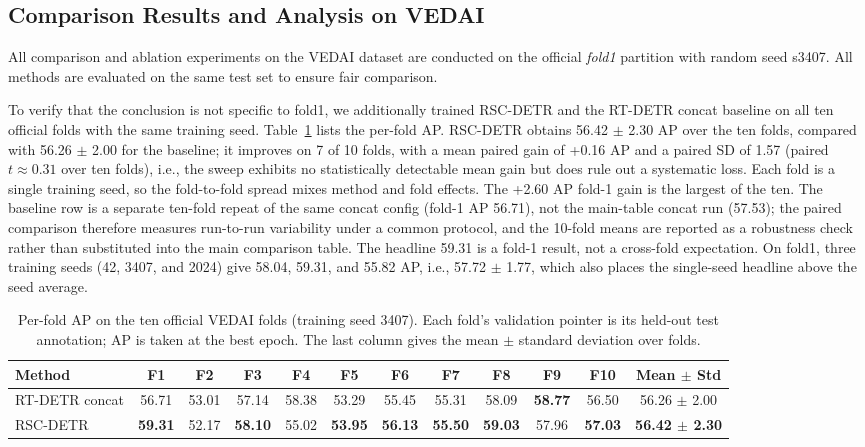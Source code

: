 \documentclass[letterpaper,journal]{IEEEtran}
\begin{document}
\subsection{Comparison Results and Analysis on VEDAI}
\label{sec:vedai_results}
All comparison and ablation experiments on the VEDAI dataset are conducted on the official \textit{fold1} partition with random seed s3407. All methods are evaluated on the same test set to ensure fair comparison.

To verify that the conclusion is not specific to fold1, we additionally trained RSC-DETR and the RT-DETR concat baseline on all ten official folds with the same training seed. Table~\ref{tab:vedai_10fold} lists the per-fold AP. RSC-DETR obtains 56.42 $\pm$ 2.30 AP over the ten folds, compared with 56.26 $\pm$ 2.00 for the baseline; it improves on 7 of 10 folds, with a mean paired gain of +0.16 AP and a paired SD of 1.57 (paired $t \approx 0.31$ over ten folds), i.e., the sweep exhibits no statistically detectable mean gain but does rule out a systematic loss. Each fold is a single training seed, so the fold-to-fold spread mixes method and fold effects. The +2.60 AP fold-1 gain is the largest of the ten. The baseline row is a separate ten-fold repeat of the same concat config (fold-1 AP 56.71), not the main-table concat run (57.53); the paired comparison therefore measures run-to-run variability under a common protocol, and the 10-fold means are reported as a robustness check rather than substituted into the main comparison table. The headline 59.31 is a fold-1 result, not a cross-fold expectation. On fold1, three training seeds (42, 3407, and 2024) give 58.04, 59.31, and 55.82 AP, i.e., 57.72 $\pm$ 1.77, which also places the single-seed headline above the seed average.

\begin{table}[!t]
\centering
\caption{Per-fold AP on the ten official VEDAI folds (training seed 3407). Each fold's validation pointer is its held-out test annotation; AP is taken at the best epoch. The last column gives the mean $\pm$ standard deviation over folds.}
\label{tab:vedai_10fold}
\setlength{\tabcolsep}{4pt}
\small
\begin{tabular}{lccccccccccc}
\toprule
Method & F1 & F2 & F3 & F4 & F5 & F6 & F7 & F8 & F9 & F10 & Mean $\pm$ Std \\
\midrule
RT-DETR concat & 56.71 & 53.01 & 57.14 & 58.38 & 53.29 & 55.45 & 55.31 & 58.09 & \textbf{58.77} & 56.50 & 56.26 $\pm$ 2.00 \\
RSC-DETR & \textbf{59.31} & 52.17 & \textbf{58.10} & 55.02 & \textbf{53.95} & \textbf{56.13} & \textbf{55.50} & \textbf{59.03} & 57.96 & \textbf{57.03} & \textbf{56.42 $\pm$ 2.30} \\
\bottomrule
\end{tabular}
\end{table}
\end{document}

